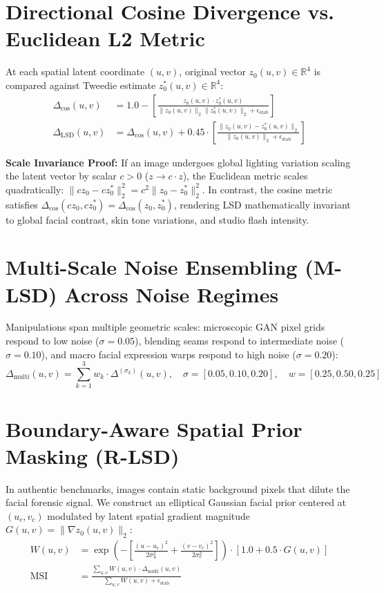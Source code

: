 \documentclass[12pt,a4paper]{report}
\begin{document}
\section{Directional Cosine Divergence vs. Euclidean L2 Metric}
At each spatial latent coordinate $(u, v)$, original vector $z_0(u, v) \in \mathbb{R}^4$ is compared against Tweedie estimate $z^*_0(u, v) \in \mathbb{R}^4$:
\begin{align}
    \Delta_{\cos}(u, v) &= 1.0 - \left[ \frac{z_0(u, v) \cdot z^*_0(u, v)}{\|z_0(u, v)\|_2 \|z^*_0(u, v)\|_2 + \epsilon_{\text{stab}}} \right] \\
    \Delta_{\text{LSD}}(u, v) &= \Delta_{\cos}(u, v) + 0.45 \cdot \left[ \frac{\|z_0(u, v) - z^*_0(u, v)\|_2}{\|z_0(u, v)\|_2 + \epsilon_{\text{stab}}} \right]
\end{align}

\noindent\textbf{Scale Invariance Proof:} If an image undergoes global lighting variation scaling the latent vector by scalar $c > 0$ ($z \rightarrow c \cdot z$), the Euclidean metric scales quadratically: $\|c z_0 - c z^*_0\|_2^2 = c^2 \|z_0 - z^*_0\|_2^2$. In contrast, the cosine metric satisfies $\Delta_{\cos}(c z_0, c z^*_0) = \Delta_{\cos}(z_0, z^*_0)$, rendering LSD mathematically invariant to global facial contrast, skin tone variations, and studio flash intensity.

\section{Multi-Scale Noise Ensembling (M-LSD) Across Noise Regimes}
Manipulations span multiple geometric scales: microscopic GAN pixel grids respond to low noise ($\sigma=0.05$), blending seams respond to intermediate noise ($\sigma=0.10$), and macro facial expression warps respond to high noise ($\sigma=0.20$):
\begin{equation}
    \Delta_{\text{multi}}(u, v) = \sum_{k=1}^3 w_k \cdot \Delta^{(\sigma_k)}(u, v), \quad \sigma = [0.05, 0.10, 0.20], \quad w = [0.25, 0.50, 0.25]
\end{equation}

\section{Boundary-Aware Spatial Prior Masking (R-LSD)}
In authentic benchmarks, images contain static background pixels that dilute the facial forensic signal. We construct an elliptical Gaussian facial prior centered at $(u_c, v_c)$ modulated by latent spatial gradient magnitude $G(u, v) = \|\nabla z_0(u, v)\|_2$:
\begin{align}
    W(u, v) &= \exp\left(-\left[\frac{(u-u_c)^2}{2\sigma_u^2} + \frac{(v-v_c)^2}{2\sigma_v^2}\right]\right) \cdot [1.0 + 0.5 \cdot G(u, v)] \\
    \text{MSI} &= \frac{\sum_{u, v} W(u, v) \cdot \Delta_{\text{multi}}(u, v)}{\sum_{u, v} W(u, v) + \epsilon_{\text{stab}}}
\end{align}
\end{document}

